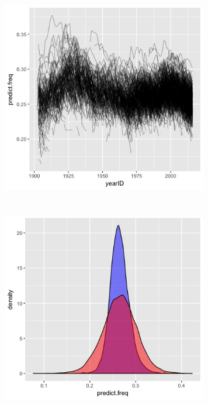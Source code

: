\documentclass[10pt,a4paper]{article}
\begin{document}
\begin{figure}[H]
\begin{center}
\includegraphics[width=9cm,height=9cm]{../PredictedTrajectories.jpeg}
\caption{}
\label{fig}
\end{center}
\end{figure}

\begin{figure}[H]
\begin{center}
\includegraphics[width=9cm,height=9cm]{../FreqResult.jpeg}
\caption{}
\label{fig}
\end{center}
\end{figure}
\end{document}
